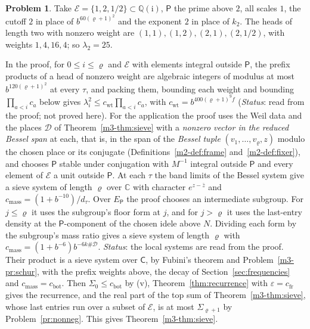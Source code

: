 \documentclass[reqno]{amsart}
\theoremstyle{definition}
\newtheorem{problem}{Problem}[section]
\theoremstyle{plain}
\theoremstyle{remark}
\newcommand{\Q}{\mathbb{Q}}
\newcommand{\C}{\mathbb{C}}
\newcommand{\ii}{\mathrm{i}}
\newcommand{\Ec}{\mathcal{E}}
\newcommand{\Pf}{\mathsf{P}}
\newcommand{\EP}{E_{\mathsf P}}
\newcommand{\cbot}{c_{\mathrm{bot}}}
\newcommand{\cm}{c_{\mathrm{mass}}}
\newcommand{\Cs}{\mathsf{C}}
\begin{document}
\begin{problem}\label{pr:prefix}
Take \(\Ec=\{1,2,1/2\}\subset\Q(\ii)\), \(\Pf\) the prime above \(2\), all scales \(1\), the cutoff \(2\) in place of \(b^{60(\varrho+1)^2}\) and the exponent \(2\) in place of \(k_2\).  The heads of length two with nonzero weight are \((1,1),(1,2),(2,1),(2,1/2)\), with weights \(1,4,16,4\); so \(\lambda_2=25\).
\end{problem}

In the proof, for \(0\le i\le\varrho\) and \(\Ec\) with elements integral outside \(\Pf\), the prefix products of a head of nonzero weight are algebraic integers of modulus at most \(b^{120(\varrho+1)^2}\) at every \(\tau\), and packing them, bounding each weight and bounding \(\prod_{a<i}c_a\) below gives \(\lambda_i^2\le c_{\mathrm{wt}}\prod_{a<i}c_a\), with \(c_{\mathrm{wt}}=b^{400(\varrho+1)^9f}\) (\emph{Status}: read from the proof; not proved here).  For the application the proof uses the Weil data and the places \(\mathcal D\) of Theorem~\ref{m3-thm:sieve} with a \emph{nonzero vector in the reduced Bessel span} at each, that is, in the span of the \emph{Bessel tuple} \((v_1,\dots,v_\varrho,z)\) modulo the chosen place or its conjugate (Definitions~\ref{m2-def:frame} and~\ref{m2-def:fixer}), and chooses \(\Pf\) stable under conjugation with \(M^{-1}\) integral outside \(\Pf\) and every element of \(\Ec\) a unit outside \(\Pf\).  At each \(\tau\) the band limits of the Bessel system give a sieve system of length \(\varrho\) over \(\C\) with character \(e^{z-\bar z}\) and \(\cm=(1+b^{-10})/d_\tau\).  Over \(\EP\) the proof chooses an intermediate subgroup.  For \(j\le\varrho\) it uses the subgroup's floor form at \(j\), and for \(j>\varrho\) it uses the last-entry density at the \(\Pf\)-component of the chosen idele above \(N\).  Dividing each form by the subgroup's mass ratio gives a sieve system of length \(\varrho\) with \(\cm=(1+b^{-6})b^{-6k\#\mathcal D}\).  \emph{Status}: the local systems are read from the proof.  Their product is a sieve system over \(\Cs\), by Fubini's theorem and Problem~\ref{m3-pr:schur}, with the prefix weights above, the decay of Section~\ref{sec:frequencies} and \(\cm=\cbot\).  Then \(\Sigma_0\le\cbot\) by (v), Theorem~\ref{thm:recurrence} with \(\varepsilon=c_{\mathrm{fr}}\) gives the recurrence, and the real part of the top sum of Theorem~\ref{m3-thm:sieve}, whose last entries run over a subset of \(\Ec\), is at most \(\Sigma_{\varrho+1}\) by Problem~\ref{pr:nonneg}.  This gives Theorem~\ref{m3-thm:sieve}.
\end{document}
